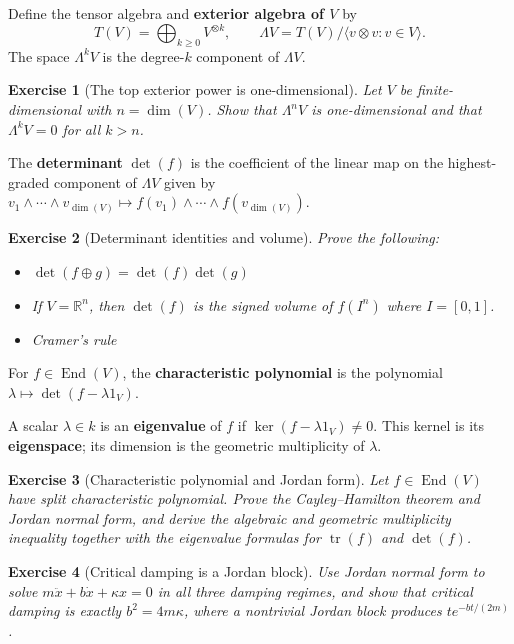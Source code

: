 \documentclass{article}
\newtheorem{exercise}{Exercise}
\newcommand{\trace}{\operatorname{tr}}
\newcommand{\End}{\operatorname{End}}
\begin{document}
Define the tensor algebra and \textbf{exterior algebra of $V$} by
\[
T(V)=\bigoplus_{k\geq 0}V^{\otimes k},
\qquad
\Lambda V=T(V)/\langle v\otimes v:v\in V\rangle.
\]
The space $\Lambda^kV$ is the degree-$k$ component of $\Lambda V$.

\begin{exercise}[The top exterior power is one-dimensional]
    Let $V$ be finite-dimensional with $n=\dim(V)$. Show that
    $\Lambda^nV$ is one-dimensional and that $\Lambda^kV=0$ for all $k>n$.
\end{exercise}

The \textbf{determinant} $\det(f)$ is the coefficient of the linear map on the highest-graded component of $\Lambda V$ given by $v_1 \wedge \cdots \wedge v_{\dim(V)} \mapsto f(v_1) \wedge \cdots \wedge f(v_{\dim(V)})$.

\begin{exercise}[Determinant identities and volume]\leavevmode\par
Prove the following:
\begin{itemize}
    \item $\det(f \oplus g) = \det(f) \det(g)$
    \item If $V = \mathbb{R}^n$, then $\det(f)$ is the signed volume of $f(I^n)$ where $I = [0,1]$.
    \item Cramer's rule
\end{itemize}
\end{exercise}

For $f\in\End(V)$, the \textbf{characteristic polynomial} is the polynomial $\lambda \mapsto \det(f - \lambda 1_V)$.

A scalar $\lambda\in k$ is an \textbf{eigenvalue} of $f$ if $\ker(f-\lambda1_V)\neq0$. This kernel is its \textbf{eigenspace}; its dimension is the geometric multiplicity of $\lambda$.

\begin{exercise}[Characteristic polynomial and Jordan form]\leavevmode\par
Let $f\in\End(V)$ have split characteristic polynomial. Prove the
Cayley--Hamilton theorem and Jordan normal form, and derive the algebraic and
geometric multiplicity inequality together with the eigenvalue formulas for
$\trace(f)$ and $\det(f)$.
\end{exercise}

\begin{exercise}[Critical damping is a Jordan block]\leavevmode\par
\textit{Use Jordan normal form to solve
$m\ddot x+b\dot x+\kappa x=0$ in all three damping regimes, and show that
critical damping is exactly $b^2=4m\kappa$, where a nontrivial Jordan block
produces $t e^{-bt/(2m)}$.}
\end{exercise}
\end{document}
